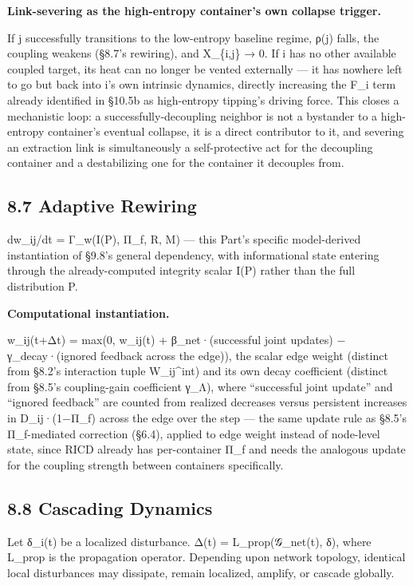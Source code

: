 \documentclass[
]{article}
\begin{document}
\textbf{Link-severing as the high-entropy container's own collapse
trigger.}

If j successfully transitions to the low-entropy baseline regime, ρ(j)
falls, the coupling weakens (§8.7's rewiring), and X\_\{i,j\} → 0. If i
has no other available coupled target, its heat can no longer be vented
externally --- it has nowhere left to go but back into i's own intrinsic
dynamics, directly increasing the F\_i term already identified in §10.5b
as high-entropy tipping's driving force. This closes a mechanistic loop:
a successfully-decoupling neighbor is not a bystander to a high-entropy
container's eventual collapse, it is a direct contributor to it, and
severing an extraction link is simultaneously a self-protective act for
the decoupling container and a destabilizing one for the container it
decouples from.

\hypertarget{adaptive-rewiring}{%
\subsection{8.7 Adaptive Rewiring}\label{adaptive-rewiring}}

dw\_ij/dt = Γ\_w(I(P), Π\_f, R, M) --- this Part's specific
model-derived instantiation of §9.8's general dependency, with
informational state entering through the already-computed integrity
scalar I(P) rather than the full distribution P.

\textbf{Computational instantiation.}

w\_ij(t+Δt) = max(0, w\_ij(t) + β\_net·(successful joint updates) −
γ\_decay·(ignored feedback across the edge)), the scalar edge weight
(distinct from §8.2's interaction tuple W\_ij\^{}int) and its own decay
coefficient (distinct from §8.5's coupling-gain coefficient γ\_Λ), where
``successful joint update'' and ``ignored feedback'' are counted from
realized decreases versus persistent increases in D\_ij·(1−Π\_f) across
the edge over the step --- the same update rule as §8.5's Π\_f-mediated
correction (§6.4), applied to edge weight instead of node-level state,
since RICD already has per-container Π\_f and needs the analogous update
for the coupling strength between containers specifically.

\hypertarget{cascading-dynamics}{%
\subsection{8.8 Cascading Dynamics}\label{cascading-dynamics}}

Let δ\_i(t) be a localized disturbance. Δ(t) = L\_prop(𝒢\_net(t), δ),
where L\_prop is the propagation operator. Depending upon network
topology, identical local disturbances may dissipate, remain localized,
amplify, or cascade globally.
\end{document}

